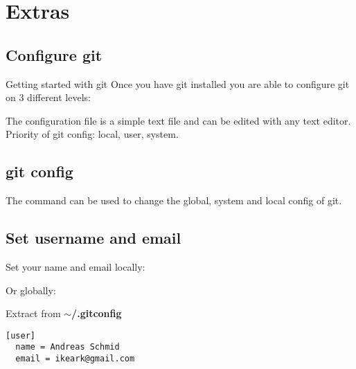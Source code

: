 \section{Extras}
\begin{frame}[fragile]
  \slidetitle
\end{frame}

\subsection{Configure git}
\begin{frame}[fragile]
  \subslidetitle
  \begin{block}{Getting started with git}
    Once you have git installed you are able to configure git on 3 different levels:
    \begin{itemize}
    \end{itemize}

    The configuration file is a simple text file and can be edited with any text editor.
    Priority of git config: local, user, system.
  \end{block}
\end{frame}

\subsection{git config}
\begin{frame}[fragile]
  \subslidetitle
  The command  can be used to change the global, system and local config of git.
  \begin{itemize}
  \end{itemize}
\end{frame}

\subsection{Set username and email}
\begin{frame}[fragile]
  \subslidetitle
  \vspace{1em}
  Set your name and email locally:
  \begin{itemize}
  \end{itemize}
  \vspace{1em}
  Or globally:
  \begin{itemize}
  \end{itemize}

  Extract from \bf{$\sim$/.gitconfig}
\begin{lstlisting}
[user]
  name = Andreas Schmid
  email = ikeark@gmail.com
\end{lstlisting}
\end{frame}

